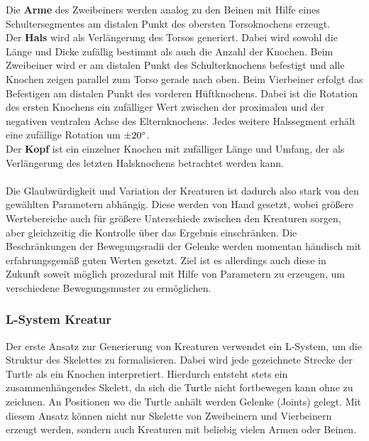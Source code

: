 Die \textbf{Arme} des Zweibeiners werden analog zu den Beinen mit Hilfe eines Schultersegmentes am distalen Punkt des obersten Torsoknochens erzeugt.\\
Der \textbf{Hals} wird als Verlängerung des Torsos generiert. Dabei wird sowohl die Länge und Dicke zufällig bestimmt als auch die Anzahl der Knochen. Beim Zweibeiner wird er am distalen Punkt des Schulterknochens befestigt und alle Knochen zeigen parallel zum Torso gerade nach oben. Beim Vierbeiner erfolgt das Befestigen am distalen Punkt des vorderen Hüftknochens. Dabei ist die Rotation des ersten Knochens ein zufälliger Wert zwischen der proximalen und der negativen ventralen Achse des Elternknochens. Jedes weitere Halssegment erhält eine zufällige Rotation um $\pm 20\degree$.\\
Der \textbf{Kopf} ist ein einzelner Knochen mit zufälliger Länge und Umfang, der als Verlängerung des letzten Halsknochens betrachtet werden kann.\\
\\
Die Glaubwürdigkeit und Variation der Kreaturen ist dadurch also stark von den gewählten Parametern abhängig. Diese werden von Hand gesetzt, wobei größere Wertebereiche auch für größere Unterschiede zwischen den Kreaturen sorgen, aber gleichzeitig die Kontrolle über das Ergebnis einschränken. Die Beschränkungen der Bewegungsradii der Gelenke werden momentan händisch mit erfahrungsgemäß guten Werten gesetzt. Ziel ist es allerdings auch diese in Zukunft soweit möglich prozedural mit Hilfe von Parametern zu erzeugen, um verschiedene Bewegungsmuster zu ermöglichen.




\subsubsection{L-System Kreatur}\label{L_System}
Der erste Ansatz zur Generierung von Kreaturen verwendet ein L-System, um die Struktur des Skelettes zu formalisieren.
Dabei wird jede gezeichnete Strecke der Turtle als ein Knochen interpretiert.
Hierdurch entsteht stets ein zusammenhängendes Skelett, da sich die Turtle nicht fortbewegen kann ohne zu zeichnen.
An Positionen wo die Turtle anhält werden Gelenke (Joints) gelegt.
Mit diesem Ansatz können nicht nur Skelette von Zweibeinern und Vierbeinern erzeugt werden, sondern auch Kreaturen mit beliebig vielen Armen oder Beinen.


